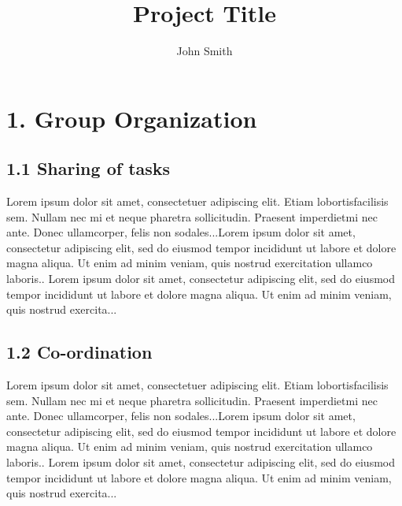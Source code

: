 \documentclass[a4paper, twoside]{report}
\title{Project Title}
\author{John Smith}
\begin{document}



\section*{1. Group Organization}

\subsection*{1.1 Sharing of tasks}
Lorem  ipsum  dolor  sit  amet,  consectetuer  adipiscing  
elit.   Etiam  lobortisfacilisis sem.  Nullam nec mi et 
neque pharetra sollicitudin.  Praesent imperdietmi nec ante. 
Donec ullamcorper, felis non sodales...Lorem ipsum dolor sit amet, consectetur adipiscing elit, sed do 
eiusmod tempor incididunt ut labore et dolore magna aliqua. Ut 
enim ad minim veniam, quis nostrud exercitation ullamco laboris..
 Lorem ipsum dolor sit amet, consectetur adipiscing elit, sed do 
eiusmod tempor incididunt ut labore et dolore magna aliqua. Ut 
enim ad minim veniam, quis nostrud exercita...

\subsection*{1.2 Co-ordination}
Lorem  ipsum  dolor  sit  amet,  consectetuer  adipiscing  
elit.   Etiam  lobortisfacilisis sem.  Nullam nec mi et 
neque pharetra sollicitudin.  Praesent imperdietmi nec ante. 
Donec ullamcorper, felis non sodales...Lorem ipsum dolor sit amet, consectetur adipiscing elit, sed do 
eiusmod tempor incididunt ut labore et dolore magna aliqua. Ut 
enim ad minim veniam, quis nostrud exercitation ullamco laboris..
 Lorem ipsum dolor sit amet, consectetur adipiscing elit, sed do 
eiusmod tempor incididunt ut labore et dolore magna aliqua. Ut 
enim ad minim veniam, quis nostrud exercita...

\section*{}
\end{document}
